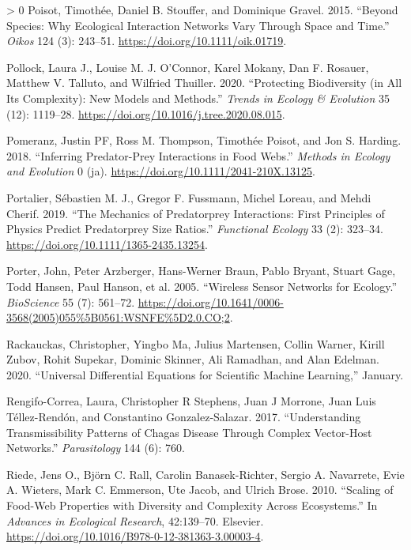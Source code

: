\documentclass[11pt]{article}
\newlength{\cslhangindent}
\newenvironment{CSLReferences}[3] %
 {%
  \setlength{\parindent}{0pt}
  \ifodd #1 \everypar{\setlength{\hangindent}{\cslhangindent}}\ignorespaces\fi
  \ifnum #2 > 0
  \setlength{\parskip}{#2\baselineskip}
  \fi
 }%
 {}
\begin{document}
\begin{CSLReferences}{1}{0}
\leavevmode\hypertarget{ref-Poisot2015SpeWhy}{}%
Poisot, Timothée, Daniel B. Stouffer, and Dominique Gravel. 2015.
{``Beyond Species: Why Ecological Interaction Networks Vary Through
Space and Time.''} \emph{Oikos} 124 (3): 243--51.
\url{https://doi.org/10.1111/oik.01719}.

\leavevmode\hypertarget{ref-Pollock2020ProBio}{}%
Pollock, Laura J., Louise M. J. O'Connor, Karel Mokany, Dan F. Rosauer,
Matthew V. Talluto, and Wilfried Thuiller. 2020. {``Protecting
Biodiversity (in All Its Complexity): New Models and Methods.''}
\emph{Trends in Ecology \& Evolution} 35 (12): 1119--28.
\url{https://doi.org/10.1016/j.tree.2020.08.015}.

\leavevmode\hypertarget{ref-Pomeranz2018InfPre}{}%
Pomeranz, Justin PF, Ross M. Thompson, Timothée Poisot, and Jon S.
Harding. 2018. {``Inferring Predator-Prey Interactions in Food Webs.''}
\emph{Methods in Ecology and Evolution} 0 (ja).
\url{https://doi.org/10.1111/2041-210X.13125}.

\leavevmode\hypertarget{ref-Portalier2019MecPre}{}%
Portalier, Sébastien M. J., Gregor F. Fussmann, Michel Loreau, and Mehdi
Cherif. 2019. {``The Mechanics of Predatorprey Interactions: First
Principles of Physics Predict Predatorprey Size Ratios.''}
\emph{Functional Ecology} 33 (2): 323--34.
\url{https://doi.org/10.1111/1365-2435.13254}.

\leavevmode\hypertarget{ref-Porter2005WirSen}{}%
Porter, John, Peter Arzberger, Hans-Werner Braun, Pablo Bryant, Stuart
Gage, Todd Hansen, Paul Hanson, et al. 2005. {``Wireless Sensor Networks
for Ecology.''} \emph{BioScience} 55 (7): 561--72.
\url{https://doi.org/10.1641/0006-3568(2005)055\%5B0561:WSNFE\%5D2.0.CO;2}.

\leavevmode\hypertarget{ref-Rackauckas2020UniDif}{}%
Rackauckas, Christopher, Yingbo Ma, Julius Martensen, Collin Warner,
Kirill Zubov, Rohit Supekar, Dominic Skinner, Ali Ramadhan, and Alan
Edelman. 2020. {``Universal Differential Equations for Scientific
Machine Learning,''} January.

\leavevmode\hypertarget{ref-Rengifo-Correa2017UndTra}{}%
Rengifo-Correa, Laura, Christopher R Stephens, Juan J Morrone, Juan Luis
Téllez-Rendón, and Constantino Gonzalez-Salazar. 2017. {``Understanding
Transmissibility Patterns of Chagas Disease Through Complex Vector-Host
Networks.''} \emph{Parasitology} 144 (6): 760.

\leavevmode\hypertarget{ref-Riede2010ScaFoo}{}%
Riede, Jens O., Björn C. Rall, Carolin Banasek-Richter, Sergio A.
Navarrete, Evie A. Wieters, Mark C. Emmerson, Ute Jacob, and Ulrich
Brose. 2010. {``Scaling of Food-Web Properties with Diversity and
Complexity Across Ecosystems.''} In \emph{Advances in Ecological
Research}, 42:139--70. Elsevier.
\url{https://doi.org/10.1016/B978-0-12-381363-3.00003-4}.


\end{CSLReferences}
\end{document}
